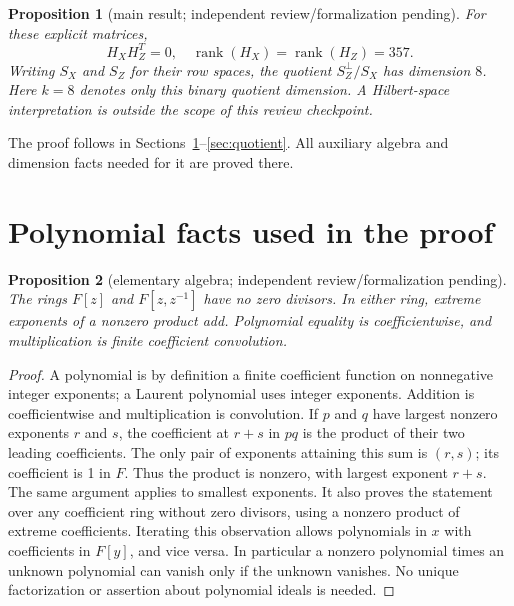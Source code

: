 \documentclass{article}
\newtheorem{proposition}{Proposition}
\DeclareMathOperator{\rank}{rank}
\begin{document}
\begin{proposition}[main result; independent review\slash formalization pending]\label{prop:main}
  For these explicit matrices,
  \begin{equation}
    H_X H_Z^T = 0, \quad \rank(H_X) = \rank(H_Z) = 357.
  \end{equation}
  Writing \(S_X\) and \(S_Z\) for their row spaces, the quotient
  \(S_Z^{\perp}/S_X\) has dimension \(8\). Here \(k = 8\) denotes only this binary
  quotient dimension. A Hilbert-space interpretation is outside the scope of this review
  checkpoint.
\end{proposition}

The proof follows in Sections~\ref{sec:polynomial}--\ref{sec:quotient}. All
auxiliary algebra and dimension facts needed for it are proved there.

\section{Polynomial facts used in the proof}\label{sec:polynomial}

\begin{proposition}[elementary algebra; independent review\slash formalization pending]%
  \label{prop:algebra}
  The rings \(F[z]\) and \(F[z, z^{-1}]\) have no zero divisors. In either
  ring, extreme exponents of a nonzero product add. Polynomial equality is
  coefficientwise, and multiplication is finite coefficient convolution.
\end{proposition}

\begin{proof}
  A polynomial is by definition a finite coefficient function on nonnegative
  integer exponents; a Laurent polynomial uses integer exponents. Addition is
  coefficientwise and multiplication is convolution. If \(p\) and \(q\) have
  largest nonzero exponents \(r\) and \(s\), the coefficient at \(r + s\) in
  \(pq\) is the product of their two leading coefficients. The only pair of
  exponents attaining this sum is \((r, s)\); its coefficient is 1 in \(F\).
  Thus the product is nonzero, with largest exponent \(r + s\). The same
  argument applies to smallest exponents. It also proves the statement over any coefficient ring
  without zero divisors, using a nonzero product of extreme coefficients.
  Iterating this observation allows polynomials in \(x\) with coefficients in
  \(F[y]\), and vice versa. In particular a nonzero polynomial times an
  unknown polynomial can vanish only if the unknown vanishes. No unique
  factorization or assertion about polynomial ideals is needed.
\end{proof}
\end{document}
